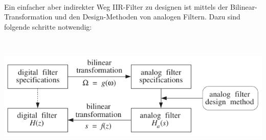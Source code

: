 % 
% 
% 
% 
%

\vspace*{-0.5cm}
\begin{minipage}{0.4\textwidth}
 $ $\\[0.5cm]
 Ein einfacher aber indirekter Weg IIR-Filter zu designen ist mittels der Bilinear-Transformation und den Design-Methoden von analogen Filtern. Dazu sind folgende schritte notwendig:
\end{minipage}
\begin{minipage}{0.05\textwidth}$ $\end{minipage}
\begin{minipage}{0.55\textwidth}
 \includegraphics[width = \textwidth]{pic/IIRFilterDesign.pdf}
\end{minipage}\\
